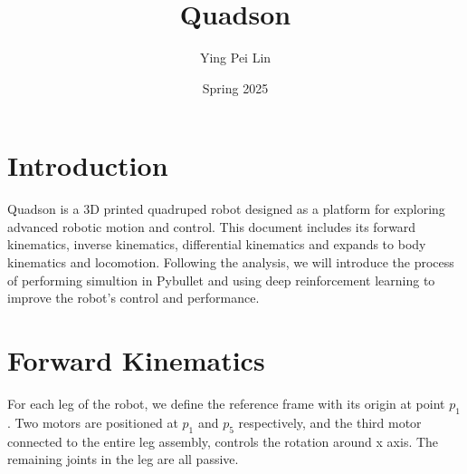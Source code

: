 \documentclass[a4paper,11pt]{article}
\begin{document}
	
\title{
	\textbf{Quadson}
}
\author{Ying Pei Lin}
\date{Spring 2025}
\maketitle

\section{Introduction}

Quadson is a 3D printed quadruped robot designed as a platform for exploring advanced robotic motion and control.
This document includes its forward kinematics, inverse kinematics, differential kinematics and expands to body kinematics and locomotion.
Following the analysis, we will introduce the process of performing simultion in Pybullet and using deep
reinforcement learning to improve the robot's control and performance.

\section{Forward Kinematics}

For each leg of the robot, we define the reference frame with its origin at point $p_1$. 
Two motors are positioned at $p_1$ and $p_5$ respectively, and the third motor
connected to the entire leg assembly, controls the rotation around x axis. The remaining joints in the leg are all passive.
\end{document}
